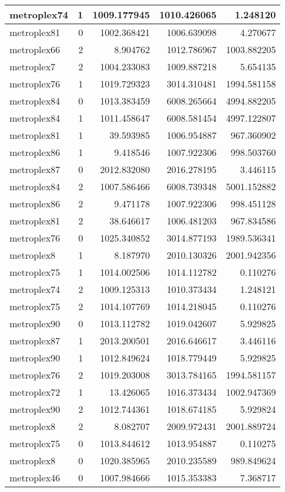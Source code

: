 \begin{longtable}{|l|r|r|r|r|}
metroplex74 & 1 & 1009.177945 & 1010.426065 & 1.248120 \\\hline
metroplex81 & 0 & 1002.368421 & 1006.639098 & 4.270677 \\\hline
metroplex66 & 2 & 8.904762 & 1012.786967 & 1003.882205 \\\hline
metroplex7 & 2 & 1004.233083 & 1009.887218 & 5.654135 \\\hline
metroplex76 & 1 & 1019.729323 & 3014.310481 & 1994.581158 \\\hline
metroplex84 & 0 & 1013.383459 & 6008.265664 & 4994.882205 \\\hline
metroplex84 & 1 & 1011.458647 & 6008.581454 & 4997.122807 \\\hline
metroplex81 & 1 & 39.593985 & 1006.954887 & 967.360902 \\\hline
metroplex86 & 1 & 9.418546 & 1007.922306 & 998.503760 \\\hline
metroplex87 & 0 & 2012.832080 & 2016.278195 & 3.446115 \\\hline
metroplex84 & 2 & 1007.586466 & 6008.739348 & 5001.152882 \\\hline
metroplex86 & 2 & 9.471178 & 1007.922306 & 998.451128 \\\hline
metroplex81 & 2 & 38.646617 & 1006.481203 & 967.834586 \\\hline
metroplex76 & 0 & 1025.340852 & 3014.877193 & 1989.536341 \\\hline
metroplex8 & 1 & 8.187970 & 2010.130326 & 2001.942356 \\\hline
metroplex75 & 1 & 1014.002506 & 1014.112782 & 0.110276 \\\hline
metroplex74 & 2 & 1009.125313 & 1010.373434 & 1.248121 \\\hline
metroplex75 & 2 & 1014.107769 & 1014.218045 & 0.110276 \\\hline
metroplex90 & 0 & 1013.112782 & 1019.042607 & 5.929825 \\\hline
metroplex87 & 1 & 2013.200501 & 2016.646617 & 3.446116 \\\hline
metroplex90 & 1 & 1012.849624 & 1018.779449 & 5.929825 \\\hline
metroplex76 & 2 & 1019.203008 & 3013.784165 & 1994.581157 \\\hline
metroplex72 & 1 & 13.426065 & 1016.373434 & 1002.947369 \\\hline
metroplex90 & 2 & 1012.744361 & 1018.674185 & 5.929824 \\\hline
metroplex8 & 2 & 8.082707 & 2009.972431 & 2001.889724 \\\hline
metroplex75 & 0 & 1013.844612 & 1013.954887 & 0.110275 \\\hline
metroplex8 & 0 & 1020.385965 & 2010.235589 & 989.849624 \\\hline
metroplex46 & 0 & 1007.984666 & 1015.353383 & 7.368717 \\\hline
\end{longtable}
